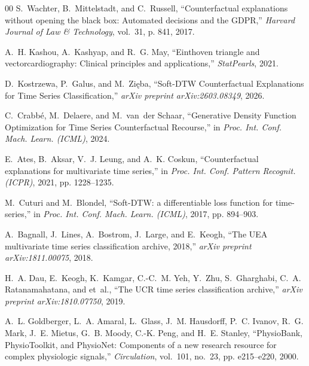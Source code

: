 \documentclass[conference]{IEEEtran}
\begin{document}
\begin{thebibliography}{00}
S.~Wachter, B.~Mittelstadt, and C.~Russell, ``Counterfactual explanations without opening the black box: Automated decisions and the GDPR,'' \emph{Harvard Journal of Law \& Technology}, vol.~31, p. 841, 2017.

A.~H. Kashou, A.~Kashyap, and R.~G. May, ``Einthoven triangle and vectorcardiography: Clinical principles and applications,'' \emph{StatPearls}, 2021.

D.~Kostrzewa, P.~Galus, and M.~Zięba, ``Soft-DTW Counterfactual Explanations for Time Series Classification,'' \emph{arXiv preprint arXiv:2603.08349}, 2026.

C.~Crabbé, M.~Delaere, and M.~van~der Schaar, ``Generative Density Function Optimization for Time Series Counterfactual Recourse,'' in \emph{Proc. Int. Conf. Mach. Learn. (ICML)}, 2024.

E.~Ates, B.~Aksar, V.~J. Leung, and A.~K. Coskun, ``Counterfactual explanations for multivariate time series,'' in \emph{Proc. Int. Conf. Pattern Recognit. (ICPR)}, 2021, pp. 1228--1235.

M.~Cuturi and M.~Blondel, ``Soft-DTW: a differentiable loss function for time-series,'' in \emph{Proc. Int. Conf. Mach. Learn. (ICML)}, 2017, pp. 894--903.

A.~Bagnall, J.~Lines, A.~Bostrom, J.~Large, and E.~Keogh, ``The UEA multivariate time series classification archive, 2018,'' \emph{arXiv preprint arXiv:1811.00075}, 2018.

H.~A. Dau, E.~Keogh, K.~Kamgar, C.-C.~M. Yeh, Y.~Zhu, S.~Gharghabi, C.~A. Ratanamahatana, and et~al., ``The UCR time series classification archive,'' \emph{arXiv preprint arXiv:1810.07750}, 2019.

A.~L. Goldberger, L.~A. Amaral, L.~Glass, J.~M. Hausdorff, P.~C. Ivanov, R.~G. Mark, J.~E. Mietus, G.~B. Moody, C.-K. Peng, and H.~E. Stanley, ``PhysioBank, PhysioToolkit, and PhysioNet: Components of a new research resource for complex physiologic signals,'' \emph{Circulation}, vol.~101, no.~23, pp. e215--e220, 2000.

\end{thebibliography}
\end{document}
